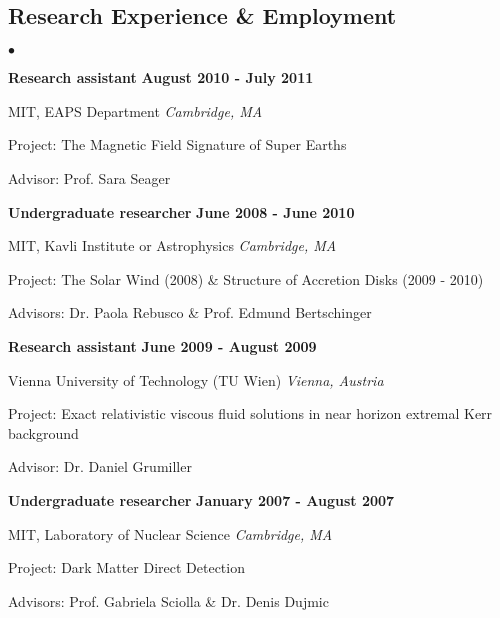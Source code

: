 \documentclass[margin,line]{res}
\newenvironment{list1}{
  \begin{list}{\ding{113}}{%
      \setlength{\itemsep}{0in}
      \setlength{\parsep}{0in} \setlength{\parskip}{0in}
      \setlength{\topsep}{0in} \setlength{\partopsep}{0in} 
      \setlength{\leftmargin}{0.17in}}}{\end{list}}
\newenvironment{list2}{
  \begin{list}{$\bullet$}{%
      \setlength{\itemsep}{0in}
      \setlength{\parsep}{0in} \setlength{\parskip}{0in}
      \setlength{\topsep}{0in} \setlength{\partopsep}{0in} 
      \setlength{\leftmargin}{0.2in}}}{\end{list}}
\begin{document}
\begin{resume}
\section{\sc Research Experience \& Employment}
\begin{list2}
\item[] {\bf Research assistant} \hfill {\bf August 2010 - July 2011}
\begin{list1}
\item[] MIT, EAPS Department \hfill \textit{Cambridge, MA}
\item[] Project: The Magnetic Field Signature of Super Earths
\item[] Advisor: Prof. Sara Seager \\
\end{list1}

\item[] {\bf Undergraduate researcher} \hfill {\bf June 2008 - June 2010}
\begin{list1}
\item[] MIT, Kavli Institute or Astrophysics \hfill \textit{Cambridge, MA}
\item[] Project: The Solar Wind (2008) \& Structure of Accretion Disks (2009 - 2010)
\item[] Advisors: Dr. Paola Rebusco \& Prof. Edmund Bertschinger \\
\end{list1}

\item[] {\bf Research assistant} \hfill {\bf June 2009 - August 2009}
\begin{list1}
\item[] Vienna University of Technology (TU Wien) \hfill \textit{Vienna, Austria}
\item[] Project: Exact relativistic viscous fluid solutions in near horizon extremal Kerr background
\item[] Advisor: Dr. Daniel Grumiller \\
\end{list1}

\item[] {\bf Undergraduate researcher} \hfill {\bf January 2007 - August 2007}
\begin{list1}
\item[] MIT, Laboratory of Nuclear Science \hfill \textit{Cambridge, MA}
\item[] Project: Dark Matter Direct Detection
\item[] Advisors: Prof. Gabriela Sciolla \& Dr. Denis Dujmic \\
\end{list1}


\end{list2}
\end{resume}
\end{document}
